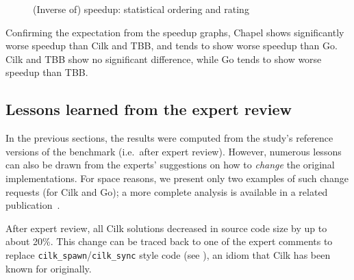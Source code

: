 \begin{figure}[htbp]
  \centering
  \vspace{-2ex}
  \caption{(Inverse of) speedup: statistical ordering and rating}
  \label{fig:ord:speedup}
\end{figure}

Confirming the expectation from the speedup graphs, Chapel shows significantly worse speedup than Cilk and TBB, and tends to show worse speedup than Go. Cilk and TBB show no significant difference, while Go tends to show worse speedup than TBB.

\subsection{Lessons learned from the expert review}
\label{sec:influence-expert}

In the previous sections, the results were computed from the study's reference versions of the benchmark (i.e.\ after expert review). However, numerous lessons can also be drawn from the experts' suggestions on how to \emph{change} the original implementations. For space reasons, we present only two examples of such change requests (for Cilk and Go); a more complete analysis is available in a related publication~\cite{nanz-et-al:2013:examining}.





\codecilk{}{}
After expert review, all Cilk solutions decreased in source code size by up to about 20\%. This change can be traced back to one of the expert comments to replace \lstinline[basicstyle=\normalsize]{cilk_spawn}/\lstinline[basicstyle=\normalsize]{cilk_sync} style code (see ), an idiom that Cilk has been known for originally.

